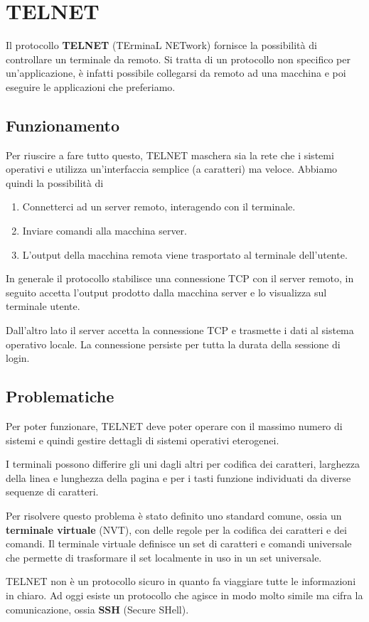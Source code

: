 \section{TELNET}
Il protocollo \textbf{TELNET} (TErminaL NETwork) fornisce la 
possibilità di controllare un terminale da remoto. Si tratta di un 
protocollo non specifico per un'applicazione, è infatti possibile 
collegarsi da remoto ad una macchina e poi eseguire le applicazioni 
che preferiamo.

\subsection{Funzionamento}
Per riuscire a fare tutto questo, TELNET maschera sia la rete che i 
sistemi operativi e utilizza un'interfaccia semplice (a caratteri) ma 
veloce. Abbiamo quindi la possibilità di
\begin{enumerate}
	\item Connetterci ad un server remoto, interagendo con il 
		terminale.
	\item Inviare comandi alla macchina server.
	\item L'output della macchina remota viene trasportato al terminale
		dell'utente.
\end{enumerate}
In generale il protocollo stabilisce una connessione TCP con il server 
remoto, in seguito accetta l'output prodotto dalla macchina server e lo
visualizza sul terminale utente.

Dall'altro lato il server accetta la connessione TCP e trasmette i 
dati al sistema operativo locale. La connessione persiste per tutta 
la durata della sessione di login.

\subsection{Problematiche}
Per poter funzionare, TELNET deve poter operare con il massimo numero
di sistemi e quindi gestire dettagli di sistemi operativi eterogenei.

I terminali possono differire gli uni dagli altri per codifica dei 
caratteri, larghezza della linea e lunghezza della pagina e per i tasti
funzione individuati da diverse sequenze di caratteri.

Per risolvere questo problema è stato definito uno standard comune, 
ossia un \textbf{terminale virtuale} (NVT), con delle regole per la
codifica dei caratteri e dei comandi.
Il terminale virtuale definisce un set di caratteri e comandi 
universale che permette di trasformare il set localmente in uso in un 
set universale.

TELNET non è un protocollo sicuro in quanto fa viaggiare tutte le 
informazioni in chiaro. Ad oggi esiste un protocollo che agisce in modo
molto simile ma cifra la comunicazione, ossia \textbf{SSH} (Secure 
SHell).

